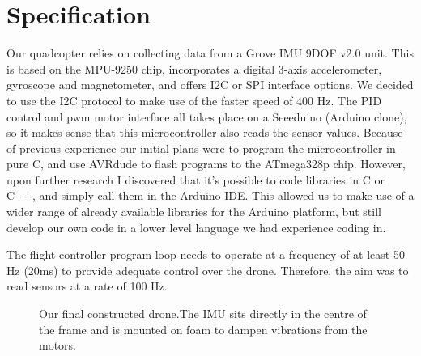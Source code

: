 \let\cleardoublepage\clearpage

\chapter{Specification} \label{Chapter:Specification}
Our quadcopter relies on collecting data from a Grove IMU 9DOF v2.0 unit. This is based on the MPU-9250 chip, incorporates a digital 3-axis accelerometer, gyroscope and magnetometer, and offers I2C or SPI interface options. We decided to use the I2C protocol to make use of the faster speed of 400 Hz.  The PID control and pwm motor interface all takes place on a Seeeduino (Arduino clone), so it makes sense that this microcontroller also reads the sensor values. Because of previous experience our initial plans were to program the microcontroller in pure C, and use AVRdude to flash programs to the ATmega328p chip. However, upon further research I discovered that it’s possible to code libraries in C or C++, and simply call them in the Arduino IDE. This allowed us to make use of a wider range of already available libraries for the Arduino platform, but still develop our own code in a lower level language we had experience coding in.

The flight controller program loop needs to operate at a frequency of at least 50 Hz (20ms) to provide adequate control over the drone. Therefore, the aim was to read sensors at a rate of 100 Hz. 

\begin{figure}[H]
	\centering
	\caption{Our final constructed drone.The IMU sits directly in the centre of the frame and is mounted on foam to dampen vibrations from the motors.}
	\label{fig:drone}
	\hfill
\end{figure}